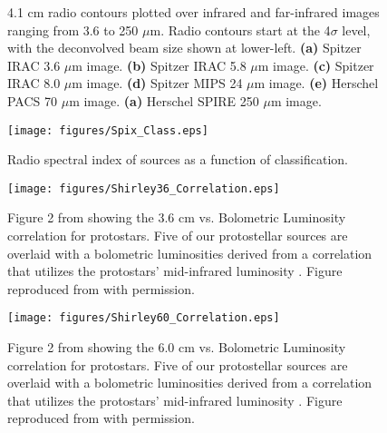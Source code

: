 \documentclass[apj]{emulateapj}
\begin{document}
\begin{figure}
\label{fig:infrared_associations}
\caption{\small{ 4.1 cm radio contours plotted over infrared and far-infrared images ranging from 3.6 to 250 $\mu$m. Radio contours start at the 4$\sigma$ level, with the deconvolved beam size shown at lower-left. {\bfseries (a)} Spitzer IRAC 3.6 $\mu$m image. {\bfseries (b)} Spitzer IRAC 5.8 $\mu$m image. {\bfseries (c)} Spitzer IRAC 8.0 $\mu$m image. {\bfseries (d)} Spitzer MIPS 24 $\mu$m image. {\bfseries (e)} Herschel PACS 70 $\mu$m image. {\bfseries (a)} Herschel SPIRE 250 $\mu$m image.
}}
\end{figure}

\begin{figure}
\label{fig:spix_class}
\centering
\texttt{[image: figures/Spix\_Class.eps]}
\caption{\small{Radio spectral index of sources as a function of classification.
}}
\end{figure}

\begin{figure}
\label{fig:shirley36_corr}
\centering
\texttt{[image: figures/Shirley36\_Correlation.eps]}
\caption{\small{Figure 2 from \citet{Shirley07} showing the 3.6 cm vs. Bolometric Luminosity correlation for protostars. Five of our protostellar sources are overlaid with a bolometric luminosities derived from a correlation that utilizes the protostars' mid-infrared luminosity \citep{Kryukova12}. Figure reproduced from \citet{Shirley07} with permission.
}}
\end{figure}

\begin{figure}
\label{fig:shirley60_corr}
\centering
\texttt{[image: figures/Shirley60\_Correlation.eps]}
\caption{\small{Figure 2 from \citet{Shirley07} showing the 6.0 cm vs. Bolometric Luminosity correlation for protostars. Five of our protostellar sources are overlaid with a bolometric luminosities derived from a correlation that utilizes the protostars' mid-infrared luminosity \citep{Kryukova12}. Figure reproduced from \citet{Shirley07} with permission.
}}
\end{figure}




\end{document}
